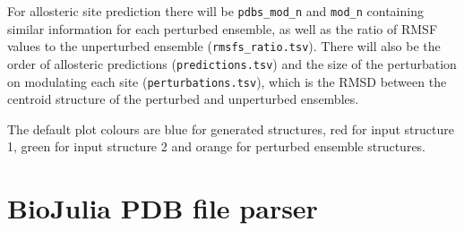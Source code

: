 For allosteric site prediction there will be \verb|pdbs_mod_n| and \verb|mod_n| containing similar information for each perturbed ensemble, as well as the ratio of RMSF values to the unperturbed ensemble (\verb|rmsfs_ratio.tsv|). There will also be the order of allosteric predictions (\verb|predictions.tsv|) and the size of the perturbation on modulating each site (\verb|perturbations.tsv|), which is the RMSD between the centroid structure of the perturbed and unperturbed ensembles.

The default plot colours are blue for generated structures, red for input structure 1, green for input structure 2 and orange for perturbed ensemble structures.


\section{BioJulia PDB file parser}

